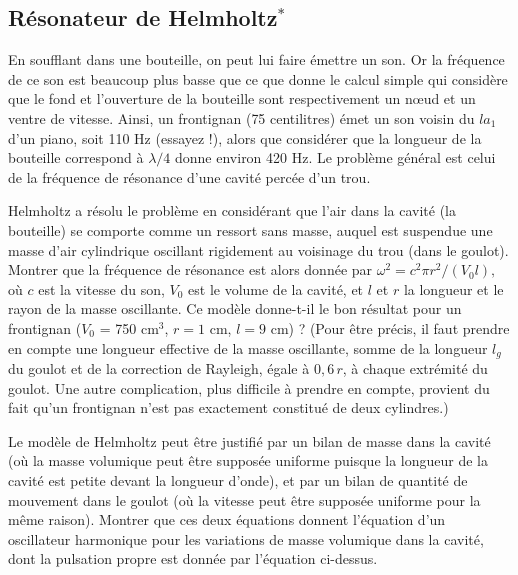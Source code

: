 \subsection{R\'esonateur de Helmholtz$^*$}

En soufflant dans une bouteille, on peut lui faire \'emettre un son. 
Or la fr\'equence de ce son est beaucoup plus basse que ce que donne le calcul simple 
qui consid\`ere que le fond et l'ouverture de la bouteille sont respectivement un n{\oe}ud 
et un ventre de vitesse. 
Ainsi, un frontignan (75 centilitres) \'emet un son voisin du $la_1$ d'un piano, 
soit 110 Hz (essayez !), alors que consid\'erer que la longueur de la bouteille correspond 
\`a $\lambda/4$ donne environ 420 Hz. 
Le probl\`eme g\'en\'eral est celui de la fr\'equence de r\'esonance d'une cavit\'e perc\'ee 
d'un trou.

Helmholtz a r\'esolu le probl\`eme en consid\'erant que l'air dans la cavit\'e (la bouteille) 
se comporte comme un ressort sans masse, auquel est suspendue une  masse d'air cylindrique 
oscillant rigidement au voisinage du trou (dans le goulot). 
Montrer que la fr\'equence de r\'esonance est alors donn\'ee par
$
\omega^2 = c^2 \pi r^2 / (V_0 l),
$
o\`u $c$ est la vitesse du son, $V_0$ est le volume de la cavit\'e, et $l$ et $r$ la longueur 
et le rayon de la masse oscillante. 
Ce mod\`ele donne-t-il le bon r\'esultat pour un frontignan ($V_0$ = 750 cm$^3$, $r = 1$ cm, 
$l = 9$ cm) ? 
(Pour \^etre pr\'ecis, il faut prendre en compte une longueur effective de la masse oscillante, 
somme de la longueur $l_g$ du goulot et de la correction de Rayleigh, \'egale \`a $0,6 \, r$, 
\`a chaque extr\'emit\'e du goulot. 
Une autre complication, plus difficile \`a prendre en compte, provient du fait qu'un frontignan 
n'est pas exactement constitu\'e de deux cylindres.) 

Le mod\`ele de Helmholtz peut \^etre justifi\'e par un bilan de masse dans la cavit\'e 
(o\`u la masse volumique peut \^etre suppos\'ee uniforme puisque la longueur de la cavit\'e 
est petite devant la longueur d'onde), et par un bilan de quantit\'e de mouvement dans le goulot 
(o\`u la vitesse peut \^etre suppos\'ee uniforme pour la m\^eme raison). 
Montrer que ces deux \'equations donnent l'\'equation d'un oscillateur harmonique pour 
les variations de masse volumique dans la cavit\'e, dont la pulsation propre est donn\'ee 
par l'\'equation ci-dessus.





